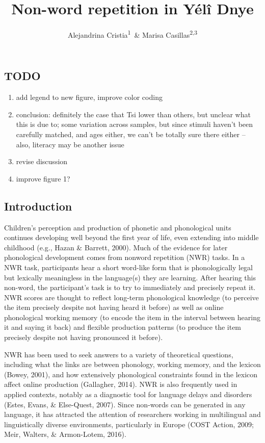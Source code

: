 \documentclass[english,,man,floatsintext]{apa6}
\author{Alejandrina Cristia\textsuperscript{1}\ \& Marisa Casillas\textsuperscript{2,3}}
\affiliation{
\vspace{0.5cm}
\textsuperscript{1} Laboratoire de Sciences Cognitives et de Psycholinguistique, Département d'Etudes cognitives, ENS, EHESS, CNRS, PSL University\\\textsuperscript{2} Max Planck Institute for Psycholinguistics\\\textsuperscript{3} University of Chicago}
\title{Non-word repetition in Yélî Dnye}
\date{}
\providecommand{\tightlist}{%
  \setlength{\itemsep}{0pt}\setlength{\parskip}{0pt}}
\begin{document}
\maketitle

\hypertarget{todo}{%
\subsection{TODO}\label{todo}}

\begin{enumerate}
\def\labelenumi{\arabic{enumi}.}
\tightlist
\item
  add legend to new figure, improve color coding
\item
  conclusion: definitely the case that Tsi lower than others, but unclear what this is due to; some variation across samples, but since stimuli haven't been carefully matched, and ages either, we can't be totally sure there either -- also, literacy may be another issue
\item
  revise discussion
\item
  improve figure 1?
\end{enumerate}

\hypertarget{introduction}{%
\subsection{Introduction}\label{introduction}}

Children's perception and production of phonetic and phonological units continues developing well beyond the first year of life, even extending into middle childhood (e.g., Hazan \& Barrett, 2000). Much of the evidence for later phonological development comes from nonword repetition (NWR) tasks. In a NWR task, participants hear a short word-like form that is phonologically legal but lexically meaningless in the language(s) they are learning. After hearing this non-word, the participant's task is to try to immediately and precisely repeat it. NWR scores are thought to reflect long-term phonological knowledge (to perceive the item precisely despite not having heard it before) as well as online phonological working memory (to encode the item in the interval between hearing it and saying it back) and flexible production patterns (to produce the item precisely despite not having pronounced it before).

NWR has been used to seek answers to a variety of theoretical questions, including what the links are between phonology, working memory, and the lexicon (Bowey, 2001), and how extensively phonological constraints found in the lexicon affect online production (Gallagher, 2014). NWR is also frequently used in applied contexts, notably as a diagnostic tool for language delays and disorders (Estes, Evans, \& Else-Quest, 2007). Since non-words can be generated in any language, it has attracted the attention of researchers working in multilingual and linguistically diverse environments, particularly in Europe (COST Action, 2009; Meir, Walters, \& Armon-Lotem, 2016).
\end{document}
